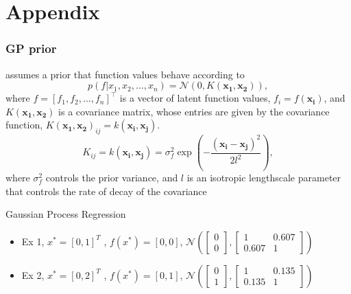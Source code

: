\section{Appendix}
\begin{frame}
    \frametitle{GP prior}
    assumes a prior that function values behave according to
    \begin{equation}\label{eq:prior_function}
        p(f | x_1, x_2, \ldots, x_n) = \mathcal{N} (0, K(\mathbf{x_1},  \mathbf{x_2})), 
    \end{equation}
    where $f = [f_1, f_2, \ldots, f_n]^{\top}$ is a vector of latent function values, $f_i = f(\mathbf{x_i})$, and $K(\mathbf{x_1}, \mathbf{x_2})$ is a covariance matrix, whose entries are given by the covariance function, $K(\mathbf{x_1}, \mathbf{x_2})_{ij} = k(\mathbf{x_i}, \mathbf{x_j})$.
    \begin{equation}\label{eq:covariance_function}
        K_{ij} = k(\mathbf{x_i}, \mathbf{x_j}) = \sigma_f^2 \exp\left( -\frac{(\mathbf{x_i} - \mathbf{x_j})^2}{2l^2} \right),
    \end{equation}
    where $\sigma_f^2$ controls the prior variance, and $l$ is an isotropic lengthscale parameter that controls the rate of decay of the covariance

\end{frame}

\begin{frame}{Gaussian Process Regression}
    \begin{itemize}
        \item Ex 1, \(x^* = [0,1]^T \) , \( f(x^*) = [0, 0] \), \(\mathcal{N}\left(\begin{bmatrix}0 \\0\end{bmatrix}, \begin{bmatrix}1 & 0.607 \\0.607 & 1 \end{bmatrix}\right)\)
        \item Ex 2, \(x^* = [0,2]^T \) , \( f(x^*) = [0, 1] \), \(\mathcal{N}\left(\begin{bmatrix}0 \\1\end{bmatrix}, \begin{bmatrix}1 & 0.135 \\0.135 & 1 \end{bmatrix}\right)\)
    \end{itemize}
        \begin{figure}[!tbp]
        \centering
        \label{fig:f1}
    \end{figure}
    
\end{frame}

